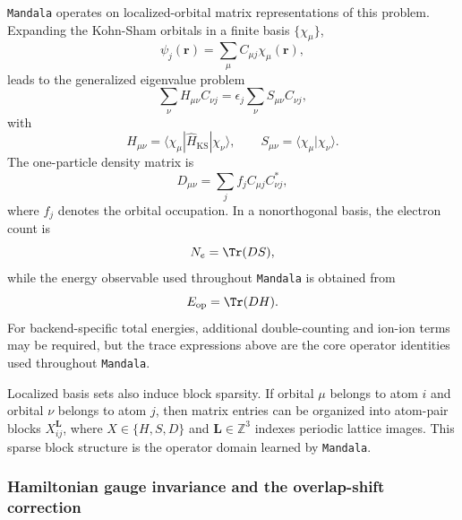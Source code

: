 \texttt{Mandala} operates on localized-orbital matrix representations of this problem.
Expanding the Kohn-Sham orbitals in a finite basis $\{\chi_{\mu}\}$,
\begin{equation}
\psi_j(\bm{r}) = \sum_{\mu} C_{\mu j}\chi_{\mu}(\bm{r}),
\end{equation}
leads to the generalized eigenvalue problem
\begin{equation}
\sum_{\nu} H_{\mu \nu} C_{\nu j}
=
\epsilon_j \sum_{\nu} S_{\mu \nu} C_{\nu j},
\end{equation}
with
\begin{equation}
H_{\mu \nu} = \langle \chi_{\mu} | \hat{H}_{\mathrm{KS}} | \chi_{\nu} \rangle,
\qquad
S_{\mu \nu} = \langle \chi_{\mu} | \chi_{\nu} \rangle.
\end{equation}
The one-particle density matrix is
\begin{equation}
D_{\mu \nu} = \sum_j f_j C_{\mu j} C_{\nu j}^{*},
\end{equation}
where $f_j$ denotes the orbital occupation. In a nonorthogonal basis, the
electron count is
\begin{equation}
N_e = \Tr(DS),
\end{equation}
while the energy observable used throughout \texttt{Mandala} is obtained from
\begin{equation}
E_{\mathrm{op}} = \Tr(DH).
\end{equation}
For backend-specific total energies, additional double-counting and ion-ion
terms may be required, but the trace expressions above are the core operator
identities used throughout \texttt{Mandala}.

Localized basis sets also induce block sparsity. If orbital $\mu$ belongs to
atom $i$ and orbital $\nu$ belongs to atom $j$, then matrix entries can be
organized into atom-pair blocks $X_{ij}^{\bm{L}}$, where
$X \in \{H,S,D\}$ and $\bm{L} \in \mathbb{Z}^3$ indexes periodic lattice
images. This sparse block structure is the operator domain learned by \texttt{Mandala}.

\subsubsection{Hamiltonian gauge invariance and the overlap-shift correction}
\label{subsubsec:gauge_invariance}


